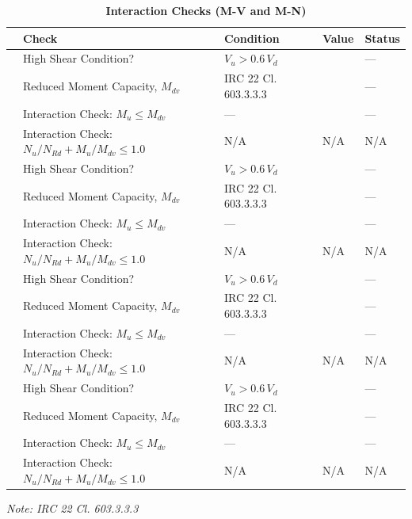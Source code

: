 \documentclass[12pt,a4paper]{report}
\numberwithin{table}{chapter}
\numberwithin{figure}{chapter}
\begin{document}
\vspace{1em}
\begin{longtable}{|C{2.5cm}|C{3.5cm}|C{3.5cm}|>{\centering\arraybackslash}p{4.2cm}|C{1.8cm}|}
\caption{\textbf{Interaction Checks (M-V and M-N)}}
\hline
\textbf{} & \textbf{Check} & \textbf{Condition} & \textbf{Value} & \textbf{Status} \\[6pt]
\hline
{} & High Shear Condition? & $V_u > 0.6\,V_d$ &  & --- \\[6pt]
 & Reduced Moment Capacity, $M_{dv}$ & IRC 22 Cl. 603.3.3.3 &  & --- \\[6pt]
 & Interaction Check: $M_u \leq M_{dv}$ & --- &  & --- \\[6pt]
 & Interaction Check: $N_u/N_{Rd} + M_u/M_{dv} \leq 1.0$ & N/A & N/A & N/A \\[6pt]
\hline
{} & High Shear Condition? & $V_u > 0.6\,V_d$ &  & --- \\[6pt]
 & Reduced Moment Capacity, $M_{dv}$ & IRC 22 Cl. 603.3.3.3 &  & --- \\[6pt]
 & Interaction Check: $M_u \leq M_{dv}$ & --- &  & --- \\[6pt]
 & Interaction Check: $N_u/N_{Rd} + M_u/M_{dv} \leq 1.0$ & N/A & N/A & N/A \\[6pt]
\hline
{} & High Shear Condition? & $V_u > 0.6\,V_d$ &  & --- \\[6pt]
 & Reduced Moment Capacity, $M_{dv}$ & IRC 22 Cl. 603.3.3.3 &  & --- \\[6pt]
 & Interaction Check: $M_u \leq M_{dv}$ & --- &  & --- \\[6pt]
 & Interaction Check: $N_u/N_{Rd} + M_u/M_{dv} \leq 1.0$ & N/A & N/A & N/A \\[6pt]
\hline
{} & High Shear Condition? & $V_u > 0.6\,V_d$ &  & --- \\[6pt]
 & Reduced Moment Capacity, $M_{dv}$ & IRC 22 Cl. 603.3.3.3 &  & --- \\[6pt]
 & Interaction Check: $M_u \leq M_{dv}$ & --- &  & --- \\[6pt]
 & Interaction Check: $N_u/N_{Rd} + M_u/M_{dv} \leq 1.0$ & N/A & N/A & N/A \\[6pt]
\hline
\end{longtable}
\noindent\textit{Note: IRC 22 Cl. 603.3.3.3}
\end{document}
